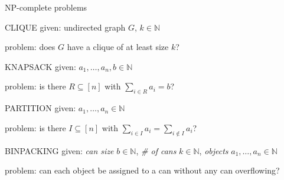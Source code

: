 \documentclass{beamer}
\theoremstyle{definition}
\begin{document}
\begin{frame}[allowframebreaks]{NP-complete problems}
\begin{block}{CLIQUE}
given: undirected graph $G$, $k \in \mathbb{N}$\par
problem: does $G$ have a clique of at least size $k$?
\end{block}

\framebreak

\begin{block}{KNAPSACK}
given: $a_1,\ldots,a_n,b \in \mathbb{N}$\par
problem: is there $R \subseteq [n]$ with $\sum_{i \in R} a_i = b$?
\end{block}

\begin{block}{PARTITION}
given: $a_1,\ldots,a_n \in \mathbb{N}$\par
problem: is there $I \subseteq [n]$ with $\sum_{i \in I} a_i = \sum_{i \not\in I} a_i$?
\end{block}

\begin{block}{BINPACKING}
given: \textit{can size} $b \in \mathbb{N}$, \textit{\# of cans} $k \in \mathbb{N}$, \textit{objects} $a_1,\ldots,a_n \in \mathbb{N}$\par
problem: can each object be assigned to a can without any can overflowing?
\end{block}

\end{frame}
\end{document}
